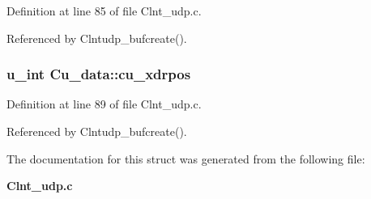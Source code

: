 Definition at line 85 of file Clnt\_\-udp.c.

Referenced by Clntudp\_\-bufcreate().
\subsubsection{\setlength{\rightskip}{0pt plus 5cm}u\_\-int {\bf Cu\_\-data::cu\_\-xdrpos}}\label{structCu__data_o8}




Definition at line 89 of file Clnt\_\-udp.c.

Referenced by Clntudp\_\-bufcreate().

The documentation for this struct was generated from the following file:\begin{CompactItemize}
\item 
{\bf Clnt\_\-udp.c}\end{CompactItemize}

